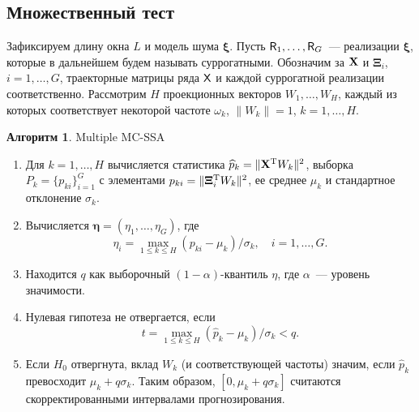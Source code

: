 \documentclass[specialist,
substylefile = spbu_report.rtx,
subf,href,colorlinks=true, 12pt]{disser}
\theoremstyle{definition}
\newtheorem{algorithm}{Алгоритм}
\begin{document}
\subsection{Множественный тест}\label{sect:multiple_test}
Зафиксируем длину окна $L$ и модель шума $\bm\xi$. Пусть $\mathsf{R}_1, \ldots, \mathsf{R}_G$~--- реализации $\bm\xi$, которые в дальнейшем будем называть суррогатными. Обозначим за $\mathbf{X}$ и $\bm\Xi_i$, $i=1,\ldots, G$, траекторные матрицы ряда $\mathsf{X}$ и каждой суррогатной реализации соответственно. Рассмотрим $H$ проекционных векторов $W_1,\ldots,W_H$, каждый из которых соответствует некоторой частоте $\omega_k$, $\|W_k\|=1$, $k=1,\ldots,H$.
\begin{algorithm}{Multiple MC-SSA~\cite{Golyandina2023}}\label{alg:multiple_mc-ssa}
	\begin{enumerate}
		\item Для $k=1,\dots,H$ вычисляется статистика $\widehat{p}_k=\|\mathbf{X}^{\mathrm{T}} W_k\|^2$, выборка $P_k=\{p_{ki}\}_{i=1}^G$ с элементами $p_{ki}=\|\bm\Xi_i^{\mathrm{T}} W_k\|^2$, ее среднее $\mu_k$ и стандартное отклонение $\sigma_k$.
		\item Вычисляется $\mathbf{\eta}=(\eta_1,\dots,\eta_G)$, где
		      \[
			      \eta_i=\max_{1\leqslant k\leqslant H}(p_{ki}-\mu_k)/\sigma_k,\quad i=1,\dots,G.
		      \]
		\item Находится $q$ как выборочный $(1-\alpha)$-квантиль $\eta$, где $\alpha$~--- уровень значимости.
		\item Нулевая гипотеза не отвергается, если
		      \[
			      t = \max_{1\leqslant k\leqslant H}(\widehat{p}_k-\mu_k)/\sigma_k<q.
		      \]
		\item Если $H_0$ отвергнута, вклад $W_k$ (и соответствующей частоты) значим, если $\widehat{p}_k$ превосходит $\mu_k+q\sigma_k$. Таким образом, $[0,\mu_k+q\sigma_k]$ считаются скорректированными интервалами прогнозирования.
	\end{enumerate}
\end{algorithm}
\end{document}
